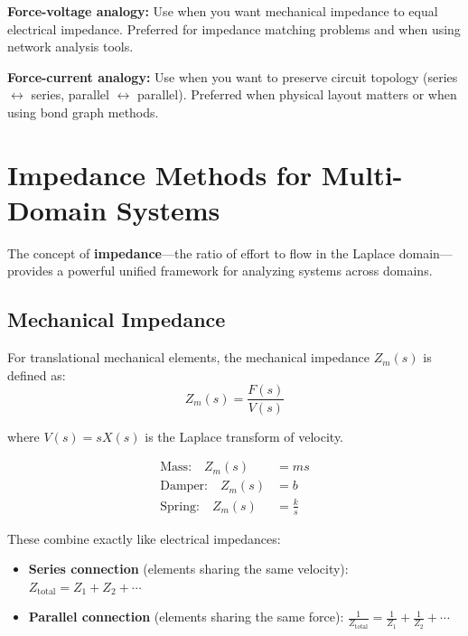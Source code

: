 \begin{keyconceptbox}[title=Choosing the Right Analogy]
\textbf{Force-voltage analogy:} Use when you want mechanical impedance to equal electrical impedance. Preferred for impedance matching problems and when using network analysis tools.

\textbf{Force-current analogy:} Use when you want to preserve circuit topology (series $\leftrightarrow$ series, parallel $\leftrightarrow$ parallel). Preferred when physical layout matters or when using bond graph methods.
\end{keyconceptbox}

\section{Impedance Methods for Multi-Domain Systems}
\label{sec:impedance}

The concept of \textbf{impedance}---the ratio of effort to flow in the Laplace domain---provides a powerful unified framework for analyzing systems across domains.

\subsection{Mechanical Impedance}

For translational mechanical elements, the mechanical impedance $Z_m(s)$ is defined as:
\begin{equation}
Z_m(s) = \frac{F(s)}{V(s)}
\end{equation}

where $V(s) = sX(s)$ is the Laplace transform of velocity.

\begin{definitionbox}[title=Mechanical Impedances]
\begin{align}
\text{Mass:} \quad Z_m(s) &= ms \label{eq:Zm_mass} \\
\text{Damper:} \quad Z_m(s) &= b \label{eq:Zm_damper} \\
\text{Spring:} \quad Z_m(s) &= \frac{k}{s} \label{eq:Zm_spring}
\end{align}
\end{definitionbox}

These combine exactly like electrical impedances:
\begin{itemize}
    \item \textbf{Series connection} (elements sharing the same velocity): $Z_{\text{total}} = Z_1 + Z_2 + \cdots$
    \item \textbf{Parallel connection} (elements sharing the same force): $\frac{1}{Z_{\text{total}}} = \frac{1}{Z_1} + \frac{1}{Z_2} + \cdots$
\end{itemize}

